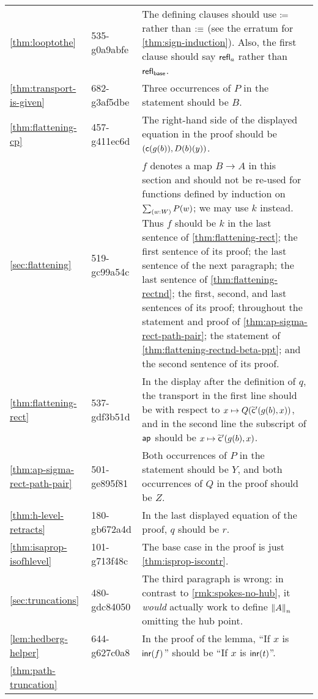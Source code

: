 \documentclass[
%
%
11pt %
]{article}
\begin{document}
\begin{longtable}{llp{10.5cm}}
  \cref{thm:looptothe}
  & 535-g0a9abfe
  & The defining clauses should use $\defid$ rather than $\defeq$ (see the erratum for \cref{thm:sign-induction}).
  Also, the first clause should say $\refl{a}$ rather than $\refl{\base}$.\\
  \cref{thm:transport-is-given}
  & 682-g3af5dbe
  & Three occurrences of $P$ in the statement should be $B$.\\
  \cref{thm:flattening-cp}
  & 457-g411ec6d
  & The right-hand side of the displayed equation in the proof should be $(\cc(g(b)),D(b)(y))$.\\
  \cref{sec:flattening}
  & 519-gc99a54c
  & $f$ denotes a map $B\to A$ in this section and should not be re-used for functions defined by induction on $\sm{w:W} P(w)$; we may use $k$ instead.
  Thus $f$ should be $k$ in the last sentence of \cref{thm:flattening-rect}; the first sentence of its proof; the last sentence of the next paragraph; the last sentence of \cref{thm:flattening-rectnd}; the first, second, and last sentences of its proof; throughout the statement and proof of \cref{thm:ap-sigma-rect-path-pair}; the statement of \cref{thm:flattening-rectnd-beta-ppt}; and the second sentence of its proof.\\
  \cref{thm:flattening-rect}
  & 537-gdf3b51d
  & In the display after the definition of $q$, the transport in the first line should be with respect to $x\mapsto Q(\cct'(g(b),x))$, and in the second line the subscript of $\apfunc{}$ should be $x\mapsto \cct'(g(b),x)$.\\
  \cref{thm:ap-sigma-rect-path-pair}
  & 501-ge895f81
  & Both occurrences of $P$ in the statement should be $Y$, and both occurrences of $Q$ in the proof should be $Z$.\\
  \cref{thm:h-level-retracts}
  & 180-gb672a4d
  & In the last displayed equation of the proof, $q$ should be $r$.\\
  \cref{thm:isaprop-isofhlevel}
  & 101-g713f48c
  & The base case in the proof is just \cref{thm:isprop-iscontr}.\\
  \cref{sec:truncations}
  & 480-gdc84050
  & The third paragraph is wrong: in contrast to \cref{rmk:spokes-no-hub}, it \emph{would} actually work to define $\trunc nA$ omitting the hub point.\\
  \cref{lem:hedberg-helper}
  & 644-g627c0a8
  & In the proof of the lemma, ``If $x$ is $\inr(f)$'' should be ``If $x$ is $\inr(t)$''.\\
  \cref{thm:path-truncation}

\end{longtable}
\end{document}

